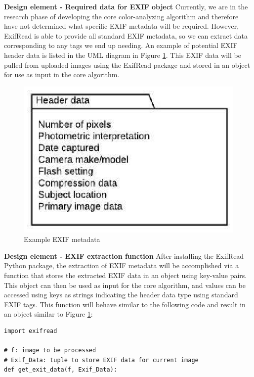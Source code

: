 \documentclass[onecolumn, draftclsnofoot,10pt, compsoc]{IEEEtran}
\begin{document}
\begin{flushleft}
\medskip


\textbf{Design element - Required data for EXIF object} Currently, we are in the research phase of developing the core color-analyzing algorithm and therefore have not determined what specific EXIF metadata will be required. However, ExifRead is able to provide all standard EXIF metadata, so we can extract data corresponding to any tags we end up needing. An example of potential EXIF header data is listed in the UML diagram in Figure \ref{fig:exif}. \cite{21} This EXIF data will be pulled from uploaded images using the ExifRead package and stored in an object for use as input in the core algorithm. 

\begin{figure}[H]
\centering
  \includegraphics{exif.eps}
  \caption{Example EXIF metadata}
  \label{fig:exif}
\end{figure}

\textbf{Design element - EXIF extraction function} After installing the ExifRead Python package, the extraction of EXIF metadata will be accomplished via a function that stores the extracted EXIF data in an object using key-value pairs. This object can then be used as input for the core algorithm, and values can be accessed using keys as strings indicating the header data type using standard EXIF tags. This function will behave similar to the following code and result in an object similar to Figure \ref{fig:exif}: \cite{18} \ \\
\begin{lstlisting}
import exifread

# f: image to be processed
# Exif_Data: tuple to store EXIF data for current image
def get_exit_data(f, Exif_Data):


\end{lstlisting}
\end{flushleft}
\end{document}
